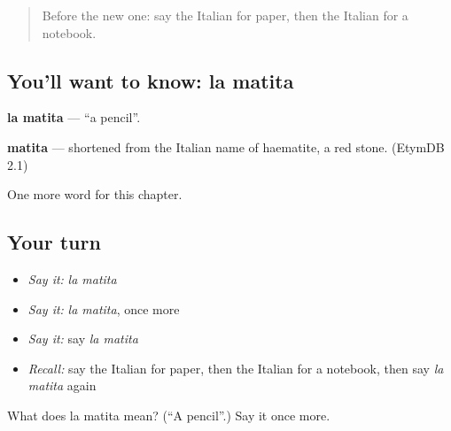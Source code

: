 \begin{quote}
Before the new one: say the Italian for paper, then the Italian for a notebook.
\end{quote}

\subsection*{You'll want to know: la matita}
\textbf{la matita} — \textquotedblleft{}a pencil\textquotedblright{}.

\begin{cousinweb}
\textbf{matita} — shortened from the Italian name of haematite, a red stone. (EtymDB 2.1)
\end{cousinweb}

\begin{grammarlens}[title={What you've built}]
One more word for this chapter.
\end{grammarlens}

\subsection*{Your turn}
\begin{itemize}
\raggedright
  \item \emph{Say it:} \emph{la matita}
  \item \emph{Say it:} \emph{la matita}, once more
  \item \emph{Say it:} say \emph{la matita}
  \item \emph{Recall:} say the Italian for paper, then the Italian for a notebook, then say \emph{la matita} again
\end{itemize}

\begin{tcolorbox}[breakable,colback=teal!4,colframe=teal!35!black,title={Before you move on}]
What does la matita mean? (\textquotedblleft{}A pencil\textquotedblright{}.) Say it once more.
\end{tcolorbox}
